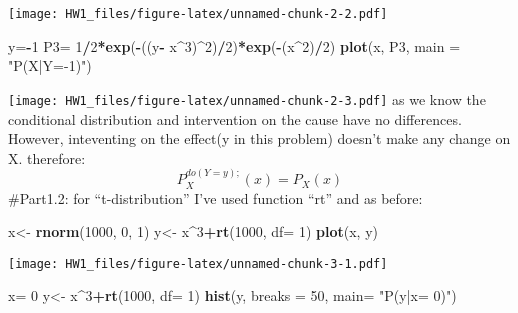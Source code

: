 \documentclass[]{article}
\newenvironment{Shaded}{\begin{snugshade}}{\end{snugshade}}
\newcommand{\DataTypeTok}[1]{\textcolor[rgb]{0.13,0.29,0.53}{#1}}
\newcommand{\DecValTok}[1]{\textcolor[rgb]{0.00,0.00,0.81}{#1}}
\newcommand{\KeywordTok}[1]{\textcolor[rgb]{0.13,0.29,0.53}{\textbf{#1}}}
\newcommand{\NormalTok}[1]{#1}
\newcommand{\OperatorTok}[1]{\textcolor[rgb]{0.81,0.36,0.00}{\textbf{#1}}}
\newcommand{\StringTok}[1]{\textcolor[rgb]{0.31,0.60,0.02}{#1}}
\begin{document}
\texttt{[image: HW1\_files/figure-latex/unnamed-chunk-2-2.pdf]}

\begin{Shaded}
\begin{Highlighting}[]
\NormalTok{y=}\OperatorTok{-}\DecValTok{1}
\NormalTok{P3=}\StringTok{ }\DecValTok{1}\OperatorTok{/}\DecValTok{2}\OperatorTok{*}\KeywordTok{exp}\NormalTok{(}\OperatorTok{-}\NormalTok{((y}\OperatorTok{-}\StringTok{ }\NormalTok{x}\OperatorTok{^}\DecValTok{3}\NormalTok{)}\OperatorTok{^}\DecValTok{2}\NormalTok{)}\OperatorTok{/}\DecValTok{2}\NormalTok{)}\OperatorTok{*}\KeywordTok{exp}\NormalTok{(}\OperatorTok{-}\NormalTok{(x}\OperatorTok{^}\DecValTok{2}\NormalTok{)}\OperatorTok{/}\DecValTok{2}\NormalTok{)}
\KeywordTok{plot}\NormalTok{(x, P3, }\DataTypeTok{main =} \StringTok{"P(X|Y=-1)"}\NormalTok{)}
\end{Highlighting}
\end{Shaded}

\texttt{[image: HW1\_files/figure-latex/unnamed-chunk-2-3.pdf]} as we
know the conditional distribution and intervention on the cause have no
differences. However, inteventing on the effect(y in this problem)
doesn't make any change on X. therefore:
\[P_{X}^{do(Y=y);}(x)= P_{X}(x)\] \#Part1.2: for ``t-distribution'' I've
used function ``rt'' and as before:

\begin{Shaded}
\begin{Highlighting}[]
\NormalTok{x<-}\StringTok{ }\KeywordTok{rnorm}\NormalTok{(}\DecValTok{1000}\NormalTok{, }\DecValTok{0}\NormalTok{, }\DecValTok{1}\NormalTok{)}
\NormalTok{y<-}\StringTok{ }\NormalTok{x}\OperatorTok{^}\DecValTok{3}\OperatorTok{+}\KeywordTok{rt}\NormalTok{(}\DecValTok{1000}\NormalTok{, }\DataTypeTok{df=} \DecValTok{1}\NormalTok{)}
\KeywordTok{plot}\NormalTok{(x, y)}
\end{Highlighting}
\end{Shaded}

\texttt{[image: HW1\_files/figure-latex/unnamed-chunk-3-1.pdf]}

\begin{Shaded}
\begin{Highlighting}[]
\NormalTok{x=}\StringTok{ }\DecValTok{0}
\NormalTok{y<-}\StringTok{ }\NormalTok{x}\OperatorTok{^}\DecValTok{3}\OperatorTok{+}\KeywordTok{rt}\NormalTok{(}\DecValTok{1000}\NormalTok{, }\DataTypeTok{df=} \DecValTok{1}\NormalTok{)}
\KeywordTok{hist}\NormalTok{(y, }\DataTypeTok{breaks =}  \DecValTok{50}\NormalTok{, }\DataTypeTok{main=} \StringTok{"P(y|x= 0)"}\NormalTok{)}
\end{Highlighting}
\end{Shaded}
\end{document}

